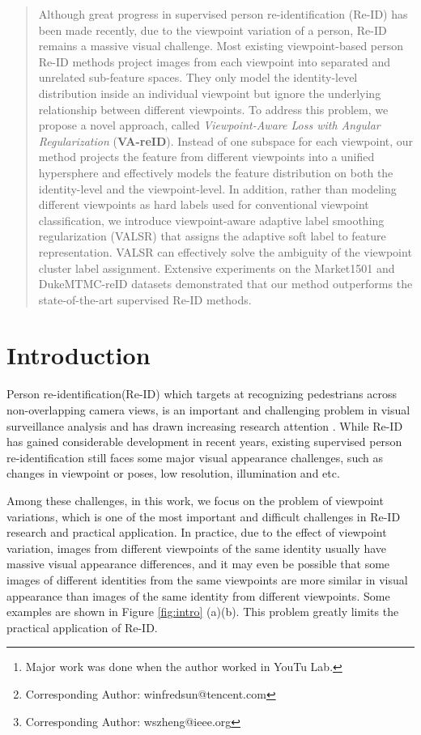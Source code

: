 \documentclass[letterpaper]{article} \usepackage{aaai20}  \usepackage{times}  \usepackage{helvet} \usepackage{courier}  \usepackage[hyphens]{url}  \usepackage{graphicx} \usepackage{array}
\author{
Zhihui Zhu\textsuperscript{\rm 1, \rm2} \thanks{Major work was done when the author worked in YouTu Lab.},
Xinyang Jiang\textsuperscript{\rm 1},
Feng Zheng\textsuperscript{\rm 3},
Xiaowei Guo \textsuperscript{\rm 2}, 
Feiyue Huang\textsuperscript{\rm 1}, \\
\Large \textbf{ Xing Sun\textsuperscript{\rm 1} \thanks{Corresponding Author: winfredsun@tencent.com},
Weishi Zheng \textsuperscript{\rm 2} \thanks{Corresponding Author: wszheng@ieee.org}}\\
\textsuperscript{\rm 1} Tencent YouTu Lab, Shanghai, China \\
\textsuperscript{\rm 2} Sun Yat-sen University, Guangzhou, China \\
\textsuperscript{\rm 3} Southern University of Science and Technology, Shenzhen, China \\
zhuzhh27@mail2.sysu.edu.cn, winfredsun@tencent.com, wszheng@ieee.org
}
\begin{document}
\maketitle
\begin{abstract}

Although great progress in supervised person re-identification (Re-ID) has been made recently, due to the viewpoint variation of a person, Re-ID remains a massive visual challenge. Most existing viewpoint-based person Re-ID methods project images from each viewpoint into separated and unrelated sub-feature spaces. They only model the identity-level distribution inside an individual viewpoint but ignore the underlying relationship between different viewpoints. To address this problem, we propose a novel approach, called \textit{Viewpoint-Aware Loss with Angular Regularization }(\textbf{VA-reID}). Instead of one subspace for each viewpoint, our method projects the feature from different viewpoints into a unified hypersphere and effectively models the feature distribution on both the identity-level and the viewpoint-level. In addition, rather than modeling different viewpoints as hard labels used for conventional viewpoint classification, we introduce viewpoint-aware adaptive label smoothing regularization (VALSR) that assigns the adaptive soft label to feature representation. VALSR can effectively solve the ambiguity of the viewpoint cluster label assignment. Extensive experiments on the Market1501 and DukeMTMC-reID datasets demonstrated that our method outperforms the state-of-the-art supervised Re-ID methods.

\end{abstract}
 
 
\section{Introduction}
\label{sec:da}
Person re-identification(Re-ID) which targets at recognizing pedestrians across non-overlapping camera views, is an important and challenging problem in visual surveillance analysis and has drawn increasing research attention \cite{zheng2015scalable,Zhao_2017_ICCV,Sun_2018_ECCV}. While Re-ID has gained considerable development in recent years, existing supervised person re-identification still faces some major visual appearance challenges, such as changes in viewpoint or poses, low resolution, illumination and etc. 


Among these challenges, in this work, we focus on the problem of viewpoint variations, which is one of the most important and difficult challenges in Re-ID research and practical application. In practice, due to the effect of viewpoint variation, images from different viewpoints of the same identity usually have massive visual appearance differences, and it may even be possible that some images of different identities from the same viewpoints are more similar in visual appearance than images of the same identity from different viewpoints. Some examples are shown in Figure \ref{fig:intro} (a)(b). This problem greatly limits the practical application of Re-ID.
\end{document}
